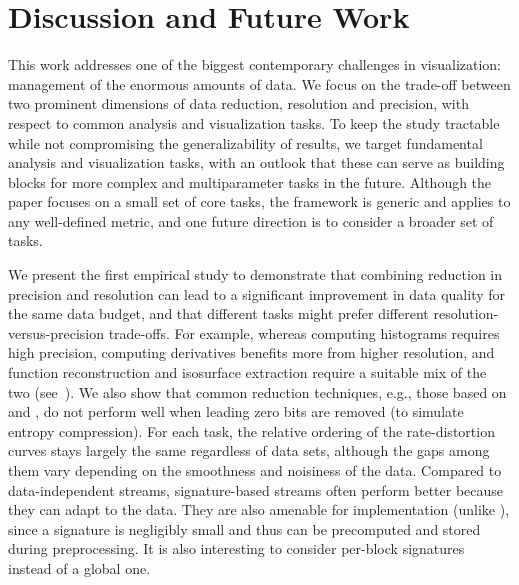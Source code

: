 \section{Discussion and Future Work}

This work addresses one of the biggest contemporary challenges in visualization: management of the
enormous amounts of data. We focus on the trade-off between two prominent dimensions of data
reduction, resolution and precision, with respect to common analysis and visualization tasks. To
keep the study tractable while not compromising the generalizability of results, we target
fundamental analysis and visualization tasks, with an outlook that these can serve as building
blocks for more complex and multiparameter tasks in the future. Although the paper focuses on a
small set of core tasks, the framework is generic and applies to any well-defined metric, and one
future direction is to consider a broader set of tasks.

We present the first empirical study to demonstrate that combining reduction in precision and
resolution can lead to a significant improvement in data quality for the same data budget, and that
different tasks might prefer different resolution-versus-precision trade-offs. For example, whereas
computing histograms requires high precision, computing derivatives benefits more from higher
resolution, and function reconstruction and isosurface extraction require a suitable mix of the two
(see~). We also show that common reduction techniques, e.g., those based on
\slvl and \smag, do not perform well when leading zero bits are removed (to simulate entropy
compression). For each task, the relative ordering of the rate-distortion curves stays largely the
same regardless of data sets, although the gaps among them vary depending on the smoothness and
noisiness of the data. Compared to data-independent streams, signature-based streams often perform
better because they can adapt to the data. They are also amenable for implementation (unlike \sopt),
since a signature is negligibly small and thus can be precomputed and stored during preprocessing.
It is also interesting to consider per-block signatures instead of a global one.

